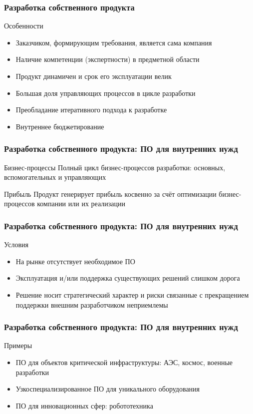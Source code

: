 \documentclass{../industrial-development}
\begin{document}
\begin{frame} \frametitle{Разработка собственного продукта}
	\begin{block}{Особенности}
		\begin{itemize}
			\item Заказчиком, формирующим требования, является сама компания
			\item Наличие компетенции (экспертности) в предметной области
			\item Продукт динамичен и срок его эксплуатации велик
			\item Большая доля управляющих процессов в цикле разработки
			\item Преобладание итеративного подхода к разработке
			\item Внутреннее бюджетирование
		\end{itemize}
	\end{block}
\end{frame}
\lecturenotes


\begin{frame} \frametitle{Разработка собственного продукта: ПО для внутренних нужд}
	\begin{block}{Бизнес-процессы}
		Полный цикл бизнес-процессов разработки: основных, вспомогательных и управляющих
	\end{block}
	\begin{block}{Прибыль}
		Продукт генерирует прибыль косвенно за счёт оптимизации бизнес-процессов компании или их реализации
	\end{block}
\end{frame}
\lecturenotes


\begin{frame} \frametitle{Разработка собственного продукта: ПО для внутренних нужд}
	\begin{block}{Условия}
		\begin{itemize}
			\item На рынке отсутствует необходимое ПО
			\item Эксплуатация и/или поддержка существующих решений слишком дорога
			\item Решение носит стратегический характер и риски связанные с прекращением поддержки внешним разработчиком неприемлемы
		\end{itemize}
	\end{block}
\end{frame}
\lecturenotes


\begin{frame} \frametitle{Разработка собственного продукта: ПО для внутренних нужд}
	\begin{block}{Примеры}
		\begin{itemize}
			\item ПО для объектов критической инфраструктуры: АЭС, космос, военные разработки
			\item Узкоспециализированное ПО для уникального оборудования
			\item ПО для инновационных сфер: робототехника
		\end{itemize}
	\end{block}
\end{frame}
\lecturenotes
\end{document}
